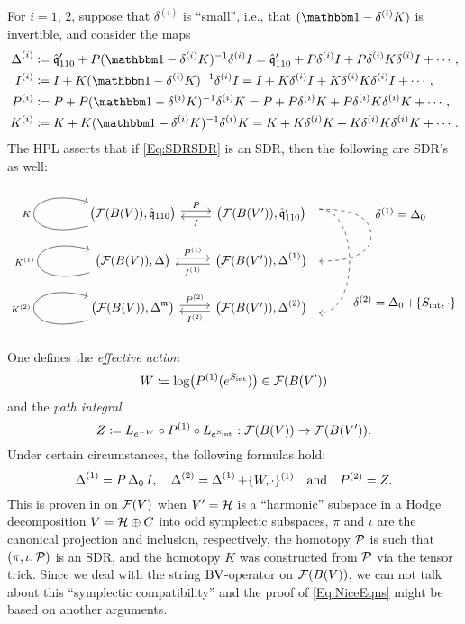 \documentclass[\MainFolder/Text.tex]{subfiles}
\begin{document}
For $i=1$, $2$, suppose that $\delta^{(i)}$ is ``small'', i.e., that $(\Id - \delta^{(i)} K)$ is invertible, and consider the maps
\begin{align*} 
 \BVOp^{(i)} &\coloneqq \hat{\OPQ}_{110}' + P(\Id - \delta^{(i)}K)^{-1}\delta^{(i)} I = \hat{\OPQ}_{110}' + P \delta^{(i)} I + P \delta^{(i)} K \delta^{(i)} I + \dotsb ,\\
 I^{(i)} &\coloneqq I + K(\Id - \delta^{(i)}K)^{-1}\delta^{(i)} I = I + K \delta^{(i)} I + K \delta^{(i)} K \delta^{(i)} I + \dotsb,\\
 P^{(i)} &\coloneqq P + P(\Id-\delta^{(i)}K)^{-1}\delta^{(i)} K = P + P \delta^{(i)} K + P \delta^{(i)} K \delta^{(i)} K + \dotsb,\\
 K^{(i)} &\coloneqq K + K(\Id-\delta^{(i)}K)^{-1}\delta^{(i)}K = K + K\delta^{(i)} K + K \delta^{(i)} K \delta^{(i)} K + \dotsb.
\end{align*}
The HPL asserts that if \eqref{Eq:SDRSDR} is an SDR, then the following are SDR's as well:
\begin{equation*}\begin{tikzcd}[execute at end picture={
\draw[->,dashed] (3.5,1.5) to[out=0,in=90] node[midway,right,xshift=.5cm]{$\delta^{(1)} = \BVOp_0$} (5,.75) to[out=-90,in=0] (3.5,0);
\draw[->,dashed] (3.5,1.5) to[out=0,in=0] node[pos=0.8,right,xshift=.3cm]{$\delta^{(2)} = \BVOp_0 + \{\IntAction,\cdot\}$} (3.5,-1.5);
}]
\bigl(\Fun(B(V)),\hat{\OPQ}_{110}\bigr) \arrow[loop left]{l}{K}\arrow[shift left]{r}{P} & \arrow[shift left]{l}{I} \bigl(\Fun(B(V')),\hat{\OPQ}_{110}'\bigr) \\
\bigl(\Fun(B(V)),\BVOp \bigr) \arrow[loop left]{l}{K^{(1)}}\arrow[shift left]{r}{P^{(1)}} & \arrow[shift left]{l}{I^{(1)}} \bigl(\Fun(B(V')),\BVOp^{(1)}\bigr)\\
\bigl(\Fun(B(V)),\BVOp^\MC \bigr) \arrow[loop left]{l}{K^{(2)}}\arrow[shift left]{r}{P^{(2)}} & \arrow[shift left]{l}{I^{(2)}} \bigl(\Fun(B(V')),\BVOp^{(2)}\bigr)
\end{tikzcd}\end{equation*}
One defines the \emph{effective action} 
$$W \coloneqq \log\bigl(P^{(1)}(e^{S_{\mathrm{int}}})\bigr) \in \mathcal{F}(B(V'))$$
and the \emph{path integral}
$$ Z \coloneqq L_{e^{-W}} \circ P^{(1)} \circ L_{e^{S_{\mathrm{int}}}}: \mathcal{F}(B(V)) \rightarrow \mathcal{F}(B(V')). $$
Under certain circumstances, the following formulas hold:
\begin{equation}\label{Eq:NiceEqns}
\operatorname{\Delta}^{(1)} = P\operatorname{\Delta}_0 I,\quad \operatorname{\Delta}^{(2)}=\operatorname{\Delta}^{(1)} + \{W,\cdot\}^{(1)}\quad\text{and}\quad P^{(2)} = Z.
\end{equation}
This is proven in \cite{Doubek2018} on $\mathcal{F}(V)$ when $V'=\mathcal{H}$ is a ``harmonic'' subspace in a Hodge decomposition $V = \mathcal{H} \oplus C$ into odd symplectic subspaces, $\pi$ and $\iota$ are the canonical projection and inclusion, respectively, the homotopy $\mathcal{P}$ is such that $(\pi,\iota,\mathcal{P})$ is an SDR, and the homotopy $K$ was constructed from $\mathcal{P}$ via the tensor trick. Since we deal with the string $\mathrm{BV}$-operator on $\mathcal{F}(B(V))$, we can not talk about this ``symplectic compatibility'' and the proof of \eqref{Eq:NiceEqns} might be based on another arguments.
\end{document}
